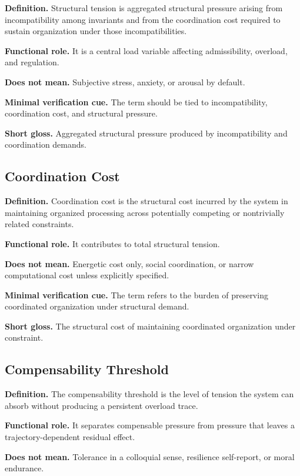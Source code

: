 \documentclass[11pt,a4paper]{article}
\begin{document}
	\textbf{Definition.} Structural tension is aggregated structural pressure arising from incompatibility among invariants and from the coordination cost required to sustain organization under those incompatibilities.
	
	\textbf{Functional role.} It is a central load variable affecting admissibility, overload, and regulation.
	
	\textbf{Does not mean.} Subjective stress, anxiety, or arousal by default.
	
	\textbf{Minimal verification cue.} The term should be tied to incompatibility, coordination cost, and structural pressure.
	
	\textbf{Short gloss.} Aggregated structural pressure produced by incompatibility and coordination demands.
	
	\subsection{Coordination Cost}
	
	\textbf{Definition.} Coordination cost is the structural cost incurred by the system in maintaining organized processing across potentially competing or nontrivially related constraints.
	
	\textbf{Functional role.} It contributes to total structural tension.
	
	\textbf{Does not mean.} Energetic cost only, social coordination, or narrow computational cost unless explicitly specified.
	
	\textbf{Minimal verification cue.} The term refers to the burden of preserving coordinated organization under structural demand.
	
	\textbf{Short gloss.} The structural cost of maintaining coordinated organization under constraint.
	
	\subsection{Compensability Threshold}
	
	\textbf{Definition.} The compensability threshold is the level of tension the system can absorb without producing a persistent overload trace.
	
	\textbf{Functional role.} It separates compensable pressure from pressure that leaves a trajectory-dependent residual effect.
	
	\textbf{Does not mean.} Tolerance in a colloquial sense, resilience self-report, or moral endurance.
	
\end{document}

